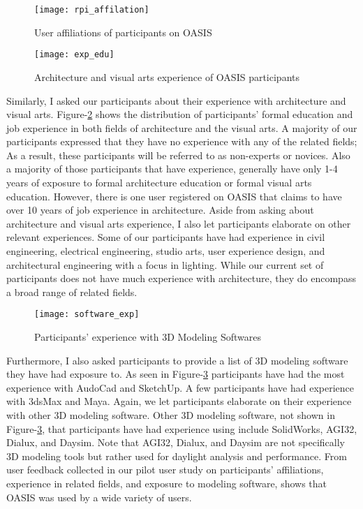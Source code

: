 	\begin{figure}[!ht]
	\centering
	\texttt{[image: rpi\_affilation]}
	\caption{User affiliations of participants on OASIS}
	\label{fig:rpi_affilation}
	\end{figure}

	\begin{figure}[!ht]
	\centering
	\texttt{[image: exp\_edu]}
	\caption{Architecture and visual arts experience of OASIS participants }
	\label{fig:exp_edu}
	\end{figure}

Similarly, I asked our participants about their experience with architecture and visual arts.
Figure-\ref{fig:exp_edu} shows the distribution of participants' formal education and job experience in both fields of architecture and the visual arts.
A majority of our participants expressed that they have no experience with any of the related fields;
As a result, these participants will be referred to as non-experts or novices.
Also a majority of those participants that have experience, generally have only 1-4 years of exposure to formal architecture education or formal visual arts education.
However, there is one user registered on OASIS that claims to have over 10 years of job experience in architecture.
Aside from asking about architecture and visual arts experience, I also let participants elaborate on other relevant experiences. 
Some of our participants have had experience in civil engineering, electrical engineering, studio arts, user experience design, and architectural engineering with a focus in lighting.
While our current set of participants does not have much experience with architecture, they do encompass a broad range of related fields.\\

\begin{figure}[!ht]
	\centering
	\texttt{[image: software\_exp]}
	\caption{Participants' experience with 3D Modeling Softwares}
	\label{fig:software_exp}
\end{figure}

Furthermore, I also asked participants to provide a list of 3D modeling software they have had exposure to.
As seen in Figure-\ref{fig:software_exp} participants have had the most experience with AudoCad\cite{todo} and SketchUp\cite{todo}. 
A few participants have had experience with 3dsMax\cite{todo} and Maya\cite{todo}.
Again, we let participants elaborate on their experience with other 3D modeling software. 
Other 3D modeling software, not shown in Figure-\ref{fig:software_exp}, that participants have had experience using include SolidWorks\cite{todo}, AGI32\cite{todo}, Dialux\cite{todo}, and Daysim\cite{todo}.
Note that AGI32, Dialux, and Daysim are not specifically 3D modeling tools but rather used for daylight analysis and performance.
From user feedback collected in our pilot user study on participants' affiliations, experience in related fields, and exposure to modeling software, shows that OASIS was used by a wide variety of users.

